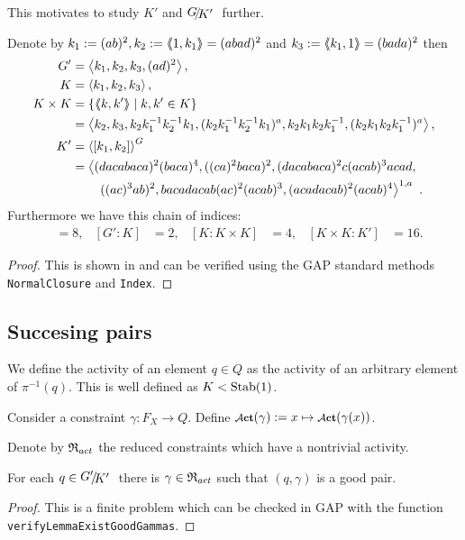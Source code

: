 \documentclass[a4paper,11pt]{amsart}
\begin{document}
This motivates to study $K'$ and $\RNK{G}{K'}$ further.
\begin{lem} \label{lem:subgroupsOfG}
Denote by $k_1 := (ab)^2, k_2:=\langle\negthickspace\langle1,k_1\rangle\negthickspace\rangle = (abad)^2$ and $k_3:=\langle\negthickspace\langle k_1,1\rangle\negthickspace\rangle = (bada)^2$ then 
 \begin{align*}
  G' &= \left< k_1,k_2,k_3,(ad)^2\right>, \\
  K &= \left< k_1,k_2,k_3\right>, \\
  K\times K &= \{\langle\negthickspace\langle k,k'\rangle\negthickspace\rangle \mid k,k'\in K\} \\&= \left< k_2,k_3,k_2k_1^{-1}k_2^{-1}k_1,(k_2k_1^{-1}k_2^{-1}k_1)^a,k_2k_1k_2k_1^{-1},(k_2k_1k_2k_1^{-1})^a  \right>,\\
  K' &= \left< [k_1,k_2] \right>^G \\ 
  &= \left<(dacabaca)^2(baca)^4,((ca)^2baca)^2,(dacabaca)^2c(acab)^3acad,\right.\\
  &\qquad\left.((ac)^3ab)^2, bacadacab(ac)^2(acab)^3, (acadacab)^2(acab)^4\right>^{1,a}\ .
 \end{align*}
Furthermore we have this chain of indices:
\begin{align*}
  [G:G']&=8, & [G':K]&=2, &[K:K\times K]&= 4, &[K\times K:K']&=16. 
\end{align*}
\end{lem}
\begin{proof}
 This is shown in \cite{Bartholdi:BranchGroups} and can be verified using the GAP standard methods
 \lstinline{NormalClosure} and \lstinline{Index}. 
\end{proof}

\subsection{Succesing pairs}
\begin{defi}
 We define the activity of an element $q\in Q$ as the activity of an arbitrary element of $\pi^{-1}(q)$. 
 This is well defined as $K<\textup{Stab}(1)$. 
 
 Consider a constraint $\gamma\colon F_X \to Q$. 
 Define $\act(\gamma):= x \mapsto \act(\gamma(x))$.
 
 Denote by $\mathfrak{R}_{act}$ the reduced constraints which have a nontrivial activity.
\end{defi}

\begin{lem} \label{lem:existsGoodGamma}
 For each $q\in\RNK{G'}{K'}$ there is $\gamma\in \mathfrak{R}_{act}$ such that $(q,\gamma)$ is a 
 good pair.
\end{lem}
\begin{proof}
 This is a finite problem which can be checked in GAP with the function \lstinline{verifyLemmaExistGoodGammas}.
\end{proof}
\end{document}

